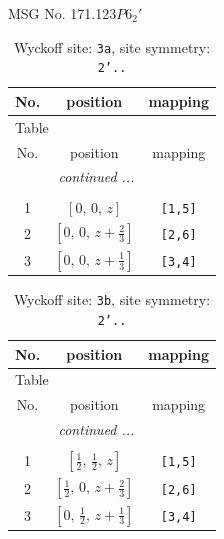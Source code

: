 \documentclass[fleqn,8pt]{jsarticle}
\begin{document}
\setcounter{MaxMatrixCols}{32}

\renewcommand{\tablename}{Table~}
\renewcommand{\figurename}{Figure~}
\begin{center}
\LARGE
MSG No. 171.123\quad$P6_{2}'$
\end{center}
\renewcommand{\arraystretch}{1.2}
\begin{longtable}{ccc}
\caption{Wyckoff site: {\tt 3a}, site symmetry: {\tt 2'..}}
 \\
 \hline \hline
No. & position & mapping \\ \hline \endfirsthead

\multicolumn{2}{l}{\tablename\ \thetable{}} \\
 \hline \hline
No. & position & mapping \\ \hline \endhead

 \hline \hline
\multicolumn{2}{r}{\footnotesize\it continued ...} \\ \endfoot

 \hline \hline
\multicolumn{2}{r}{} \\ \endlastfoot

1 & $\left[ 0,\, 0,\, z \right]$ & {\tt [1,5]} \\ \hline
2 & $\left[ 0,\, 0,\, z + \frac{2}{3} \right]$ & {\tt [2,6]} \\ \hline
3 & $\left[ 0,\, 0,\, z + \frac{1}{3} \right]$ & {\tt [3,4]} \\
\end{longtable}
\renewcommand{\arraystretch}{1.2}
\begin{longtable}{ccc}
\caption{Wyckoff site: {\tt 3b}, site symmetry: {\tt 2'..}}
 \\
 \hline \hline
No. & position & mapping \\ \hline \endfirsthead

\multicolumn{2}{l}{\tablename\ \thetable{}} \\
 \hline \hline
No. & position & mapping \\ \hline \endhead

 \hline \hline
\multicolumn{2}{r}{\footnotesize\it continued ...} \\ \endfoot

 \hline \hline
\multicolumn{2}{r}{} \\ \endlastfoot

1 & $\left[ \frac{1}{2},\, \frac{1}{2},\, z \right]$ & {\tt [1,5]} \\ \hline
2 & $\left[ \frac{1}{2},\, 0,\, z + \frac{2}{3} \right]$ & {\tt [2,6]} \\ \hline
3 & $\left[ 0,\, \frac{1}{2},\, z + \frac{1}{3} \right]$ & {\tt [3,4]} \\
\end{longtable}
\end{document}

